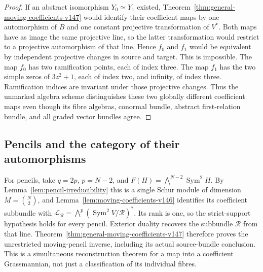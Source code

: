 \documentclass[11pt,reqno]{amsart}
\numberwithin{equation}{section}
\theoremstyle{definition}\newtheorem{definition}[theorem]{Definition}
\theoremstyle{remark}\newtheorem{remark}[theorem]{Remark}
\DeclareMathOperator{\Sym}{Sym}\DeclareMathOperator{\Gr}{Gr}
\begin{document}
\begin{proof}
If an abstract isomorphism \(Y_0\simeq Y_1\) existed,
Theorem~\ref{thm:general-moving-coefficients-v147} would identify
their coefficient maps by one automorphism of \(B\) and one
constant projective transformation of \(V^*\).  Both maps have
as image the same projective line, so the latter transformation
would restrict to a projective automorphism of that line.  Hence
\(f_0\) and \(f_1\) would be equivalent by independent projective
changes in source and target.  This is impossible.  The map \(f_0\)
has two ramification points, each of index three.  The map \(f_1\)
has the two simple zeros of \(3z^2+1\), each of index two, and
infinity, of index three.  Ramification indices are invariant under
those projective changes.  Thus the unmarked algebra scheme
distinguishes these two globally different coefficient maps even
though its fibre algebras, conormal bundle, abstract first-relation
bundle, and all graded vector bundles agree.
\end{proof}

\subsection{Pencils and the category of their automorphisms}
For pencils, take \(q=2p\), \(p=N-2\), and
\(F(H)=\bigwedge^{N-2}\Sym^2 H\).  By
Lemma~\ref{lem:pencil-irreducibility} this is a single Schur module
of dimension \(M=\binom N2\), and
Lemma~\ref{lem:moving-coefficients-v146} identifies its coefficient
subbundle with
\(\mathcal L_{\mathcal R}=\bigwedge^p(\Sym^2V/\mathcal R)^*\).
Its rank is one, so the strict-support hypothesis holds for every
pencil.  Exterior duality recovers the subbundle \(\mathcal R\)
from that line.  Theorem~\ref{thm:general-moving-coefficients-v147}
therefore proves the unrestricted moving-pencil inverse, including
its actual source-bundle conclusion.  This is a simultaneous
reconstruction theorem for a map into a coefficient Grassmannian,
not just a classification of its individual fibres.
\end{document}
